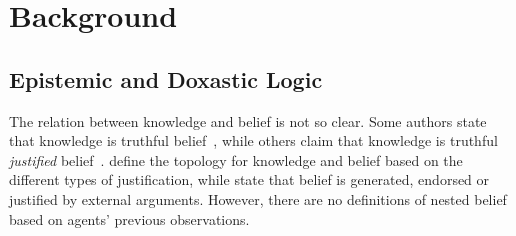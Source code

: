 \section{Background}

\subsection{Epistemic and Doxastic Logic}

\label{sec:background:epistemic_doxastic_logic}




The relation between knowledge and belief is not so clear.
Some authors state that knowledge is truthful belief~\cite{DBLP:journals/corr/DitmarschHHK15,DBLP:conf/kr/FriedmanH94,DBLP:conf/tark/FriedmanH94}, while others claim that knowledge is truthful \emph{justified} belief~\cite{DBLP:conf/nmr/Scherl22,DBLP:journals/rsl/Artemov08,DBLP:conf/atal/FanL17,DBLP:conf/kr/GrossiH14}.
\citet{DBLP:journals/rsl/BjorndahlO20} define the topology for knowledge and belief based on the different types of justification, while \citet{DBLP:conf/kr/GrossiH14} state that belief is generated, endorsed or justified by external arguments. 
However, there are no definitions of nested belief based on agents' previous observations.



